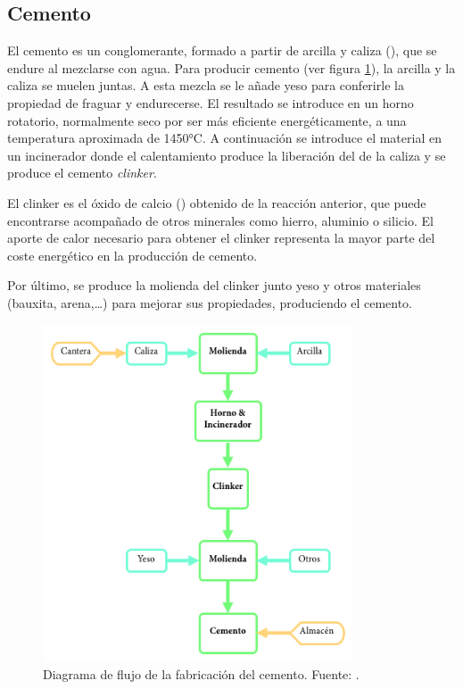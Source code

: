 \subsection{Cemento}
El cemento es un conglomerante, formado a partir de arcilla y caliza (), que se endure al mezclarse con agua. Para producir cemento (ver figura \ref{fig:cemento}), la arcilla y la caliza se muelen juntas. A esta mezcla se le añade yeso para conferirle la propiedad de fraguar y endurecerse. El resultado se introduce en un horno rotatorio, normalmente seco por ser más eficiente energéticamente, a una temperatura aproximada de 1450\si{\celsius}. A continuación se introduce el material en un incinerador donde el calentamiento produce la liberación del  de la caliza y se produce el cemento \emph{clinker}.

\begin{center}
\end{center}

El clinker es el óxido de calcio () obtenido de la reacción anterior, que puede encontrarse acompañado de otros minerales como hierro, aluminio o silicio. El aporte de calor necesario para obtener el clinker representa la mayor parte del coste energético en la producción de cemento.

Por último, se produce la molienda del clinker junto yeso y otros materiales (bauxita, arena,\ldots) para mejorar sus propiedades, produciendo el cemento.

\begin{figure}[!htb]
\centering
\includegraphics[height=10cm]{img/cemento.png}
\caption[Diagrama de flujo de la fabricación del cemento.]{Diagrama de flujo de la fabricación del cemento. Fuente: \protect\cite{jsjunnesson}.}
\label{fig:cemento}
\end{figure}

